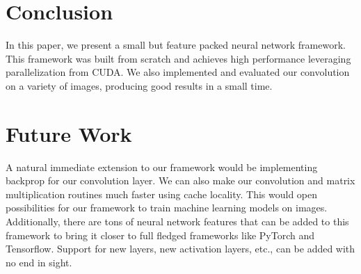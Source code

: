 \documentclass[conference]{IEEEtran}
\begin{document}


\section{Conclusion}
In this paper, we present a small but feature packed neural network framework. This framework was built from scratch and achieves high performance leveraging parallelization from CUDA. We also implemented and evaluated our convolution on a variety of images, producing good results in a small time.

\section{Future Work}
A natural immediate extension to our framework would be implementing backprop for our convolution layer. We can also make our convolution and matrix multiplication routines much faster using cache locality. This would open possibilities for our framework to train machine learning models on images. Additionally, there are tons of neural network features that can be added to this framework to bring it closer to full fledged frameworks like PyTorch and Tensorflow. Support for new layers, new activation layers, etc., can be added with no end in sight. 







%
%
%







\end{document}

